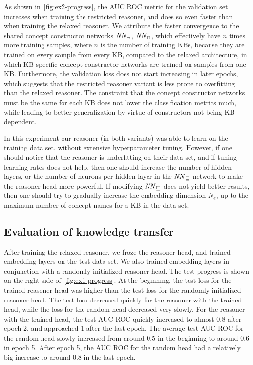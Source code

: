 As shown in~\autoref{fig:ex2-progress}, the AUC ROC metric for the validation set increases when training the restricted reasoner, and does so even faster than when training the relaxed reasoner.
We attribute the faster convergence to the shared concept constructor networks $\mathit{NN}_\lnot$, $\mathit{NN}_\sqcap$, which effectively have $n$ times more training samples, where $n$ is the number of training KBs, because they are trained on every sample from every KB, compared to the relaxed architecture, in which KB-specific concept constructor networks are trained on samples from one KB.
Furthermore, the validation loss does not start increasing in later epochs, which suggests that the restricted reasoner variant is less prone to overfitting than the relaxed reasoner.
The constraint that the concept constructor networks must be the same for each KB does not lower the classification metrics much, while leading to better generalization by virtue of constructors not being KB-dependent.

In this experiment our reasoner (in both variants) was able to learn on the training data set, without extensive hyperparameter tuning.
However, if one should notice that the reasoner is underfitting on their data set, and if tuning learning rates does not help, then one should increase the number of hidden layers, or the number of neurons per hidden layer in the $\mathit{NN}_\sqsubseteq$ network to make the reasoner head more powerful.
If modifying $\mathit{NN}_\sqsubseteq$ does not yield better results, then one should try to gradually increase the embedding dimension $N_e$, up to the maximum number of concept names for a KB in the data set.

\subsection{Evaluation of knowledge transfer}

After training the relaxed reasoner, we froze the reasoner head, and trained embedding layers on the test data set.
We also trained embedding layers in conjunction with a randomly initialized reasoner head.
The test progress is shown on the right side of~\autoref{fig:ex1-progress}.
At the beginning, the test loss for the trained reasoner head was higher than the test loss for the randomly initialized reasoner head.
The test loss decreased quickly for the reasoner with the trained head, while the loss for the random head decreased very slowly.
For the reasoner with the trained head, the test AUC ROC quickly increased to almost 0.8 after epoch 2, and approached 1 after the last epoch.
The average test AUC ROC for the random head slowly increased from around 0.5 in the beginning to around 0.6 in epoch 5.
After epoch 5, the AUC ROC for the random head had a relatively big increase to around 0.8 in the last epoch.


